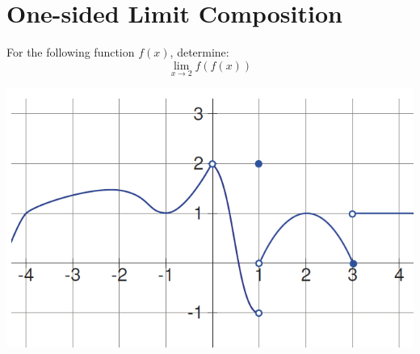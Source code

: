 \documentclass[letterpaper,12pt,fleqn]{article}
\begin{document}
\section*{One-sided Limit Composition}

For the following function \(f(x)\), determine:
\[\lim_{x\to2}f(f(x))\]

\includegraphics{compex}
\end{document}
